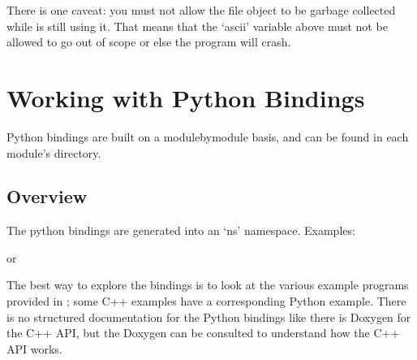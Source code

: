 \documentclass[letterpaper,10pt,english]{sphinxmanual}
\renewcommand{\sphinxcode}[1]{\texttt{\small{#1}}}
\begin{document}
There is one caveat: you must not allow the file object to be garbage collected while  is still using it.  That means that the ‘ascii’ variable above must not be allowed to go out of scope or else the program will crash.


\section{Working with Python Bindings}
\label{\detokenize{python:working-with-python-bindings}}
Python bindings are built on a module\sphinxhyphen{}by\sphinxhyphen{}module basis, and can be found in each module’s  \sphinxcode{} directory.


\subsection{Overview}
\label{\detokenize{python:overview}}
The python bindings are generated into an ‘ns’ namespace.  Examples:

\begin{sphinxVerbatim}[commandchars=\\\{\}]
   
  
\end{sphinxVerbatim}

or

\begin{sphinxVerbatim}[commandchars=\\\{\}]
 
  
\end{sphinxVerbatim}

The best way to explore the bindings is to look at the various example
programs provided in ; some C++ examples have a corresponding Python
example.  There is no structured documentation for the Python bindings
like there is Doxygen for the C++ API, but the Doxygen can be consulted
to understand how the C++ API works.
\end{document}
